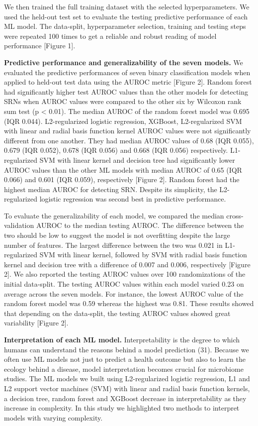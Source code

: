 \documentclass[11pt,]{article}
\begin{document}
We then trained the full training dataset with the selected
hyperparameters. We used the held-out test set to evaluate the testing
predictive performance of each ML model. The data-split, hyperparameter
selection, training and testing steps were repeated 100 times to get a
reliable and robust reading of model performance {[}Figure 1{]}.

\textbf{Predictive performance and generalizability of the seven
models.} We evaluated the predictive performances of seven binary
classification models when applied to held-out test data using the AUROC
metric {[}Figure 2{]}. Random forest had significantly higher test AUROC
values than the other models for detecting SRNs when AUROC values were
compared to the other six by Wilcoxon rank sum test (p \textless{}
0.01). The median AUROC of the random forest model was 0.695 (IQR
0.044). L2-regularized logistic regression, XGBoost, L2-regularized SVM
with linear and radial basis function kernel AUROC values were not
significantly different from one another. They had median AUROC values
of 0.68 (IQR 0.055), 0.679 (IQR 0.052), 0.678 (IQR 0.056) and 0.668 (IQR
0.056) respectively. L1-regularized SVM with linear kernel and decision
tree had significantly lower AUROC values than the other ML models with
median AUROC of 0.65 (IQR 0.066) and 0.601 (IQR 0.059), respectively
{[}Figure 2{]}. Random forest had the highest median AUROC for detecting
SRN. Despite its simplicity, the L2-regularized logistic regression was
second best in predictive performance.

To evaluate the generalizability of each model, we compared the median
cross-validation AUROC to the median testing AUROC. The difference
between the two should be low to suggest the model is not overfitting
despite the large number of features. The largest difference between the
two was 0.021 in L1-regularized SVM with linear kernel, followed by SVM
with radial basis function kernel and decision tree with a difference of
0.007 and 0.006, respectively {[}Figure 2{]}. We also reported the
testing AUROC values over 100 randomizations of the initial data-split.
The testing AUROC values within each model varied 0.23 on average across
the seven models. For instance, the lowest AUROC value of the random
forest model was 0.59 whereas the highest was 0.81. These results showed
that depending on the data-split, the testing AUROC values showed great
variability {[}Figure 2{]}.

\textbf{Interpretation of each ML model.} Interpretability is the degree
to which humans can understand the reasons behind a model prediction
(31). Because we often use ML models not just to predict a health
outcome but also to learn the ecology behind a disease, model
interpretation becomes crucial for microbiome studies. The ML models we
built using L2-regularized logistic regression, L1 and L2 support vector
machines (SVM) with linear and radial basis function kernels, a decision
tree, random forest and XGBoost decrease in interpretability as they
increase in complexity. In this study we highlighted two methods to
interpret models with varying complexity.
\end{document}
